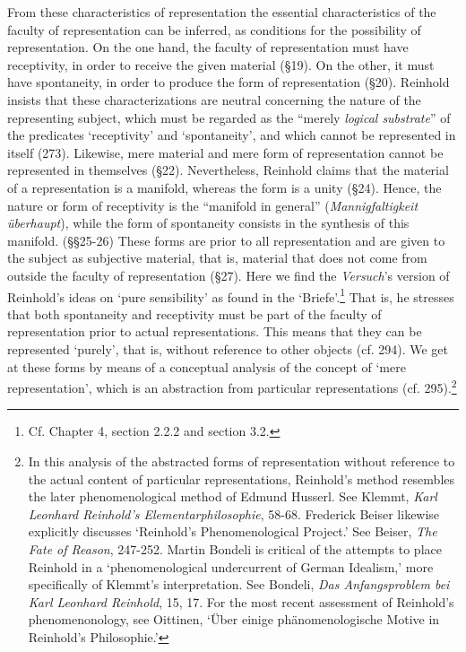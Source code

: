  From these characteristics of representation the essential characteristics of the faculty of representation can be inferred, as conditions for the possibility of representation. On the one hand, the faculty of representation must have receptivity, in order to receive the given material (\S  19). On the other, it must have spontaneity, in order to produce the form of representation (\S  20). Reinhold insists that these characterizations are neutral concerning the nature of the representing subject, which must be regarded as the ``merely \textit{logical substrate}'' of the predicates `receptivity' and `spontaneity', and which cannot be represented in itself (273). Likewise, mere material and mere form of representation cannot be represented in themselves (\S  22). Nevertheless, Reinhold claims that the material of a representation is a manifold, whereas the form is a unity (\S  24). Hence, the nature or form of receptivity is the ``manifold in general'' (\textit{Mannigfaltigkeit \"{u}berhaupt}), while the form of spontaneity consists in the synthesis of this manifold. (\S \S  25{-}26) These forms are prior to all representation and are given to the subject as subjective material, that is, material that does not come from outside the faculty of representation (\S  27). Here we find the \textit{Versuch}'s version of Reinhold's ideas on `pure sensibility' as found in the `Briefe'.\footnote{ Cf. Chapter 4, section 2.2.2 and section 3.2. } That is, he stresses that both spontaneity and receptivity must be part of the faculty of representation prior to actual representations. This means that they can be represented `purely', that is, without reference to other objects (cf. 294). We get at these forms by means of a conceptual analysis of the concept of `mere representation', which is an abstraction from particular representations (cf. 295).\footnote{ In this analysis of the abstracted forms of representation without reference to the actual content of particular representations, Reinhold's method resembles the later phenomenological method of Edmund Husserl. See Klemmt, \textit{Karl Leonhard Reinhold's Elementarphilosophie}, 58{-}68. Frederick Beiser likewise explicitly discusses `Reinhold's Phenomenological Project.' See Beiser, \textit{The Fate of Reason}, 247{-}252. Martin Bondeli is critical of the attempts to place Reinhold in a `phenomenological undercurrent of German Idealism,' more specifically of Klemmt's interpretation.  See Bondeli, \textit{Das Anfangsproblem bei Karl Leonhard Reinhold}, 15, 17. For the most recent assessment of Reinhold's phenomenonology, see Oittinen, `\"{U}ber einige ph\"{a}nomenologische Motive in Reinhold's Philosophie.'}

